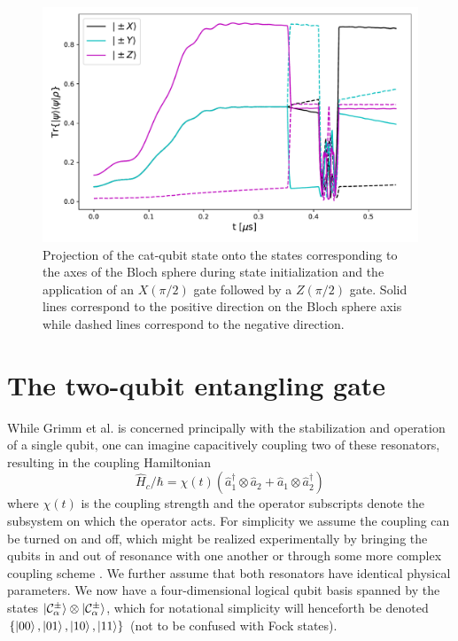 \begin{figure}[t]
    \centering
    \includegraphics[width=\columnwidth]{figures/bloch.pdf}
    \caption{Projection of the cat-qubit state onto the states corresponding to the axes of the Bloch sphere during state initialization and the application of an $X(\pi/2)$ gate followed by a $Z(\pi/2)$ gate. Solid lines correspond to the positive direction on the Bloch sphere axis while dashed lines correspond to the negative direction.}
    \label{fig:bloch}
\end{figure}

\section{\label{sec:two_qubit} The two-qubit entangling gate}

While Grimm et al. \cite{grimm_2020} is concerned principally with the stabilization and operation of a single qubit, one can imagine capacitively coupling two of these resonators, resulting in the coupling Hamiltonian
\begin{equation}
    \hat{H}_c / \hbar = \chi(t) (\hat{a}_1^\dag \otimes \hat{a}_2 + \hat{a}_1 \otimes \hat{a}_2^\dag)
\end{equation}
where $\chi(t)$ is the coupling strength and the operator subscripts denote the subsystem on which the operator acts.
For simplicity we assume the coupling can be turned on and off, which might be realized experimentally by bringing the qubits in and out of resonance with one another or through some more complex coupling scheme \cite{wendin_2017}.
We further assume that both resonators have identical physical parameters.
We now have a four-dimensional logical qubit basis spanned by the states $\ket{\mathcal{C}_\alpha^\pm} \otimes \ket{\mathcal{C}_\alpha^\pm}$, which for notational simplicity will henceforth be denoted $\{\ket{00}, \ket{01}, \ket{10}, \ket{11}  \}$ (not to be confused with Fock states).

